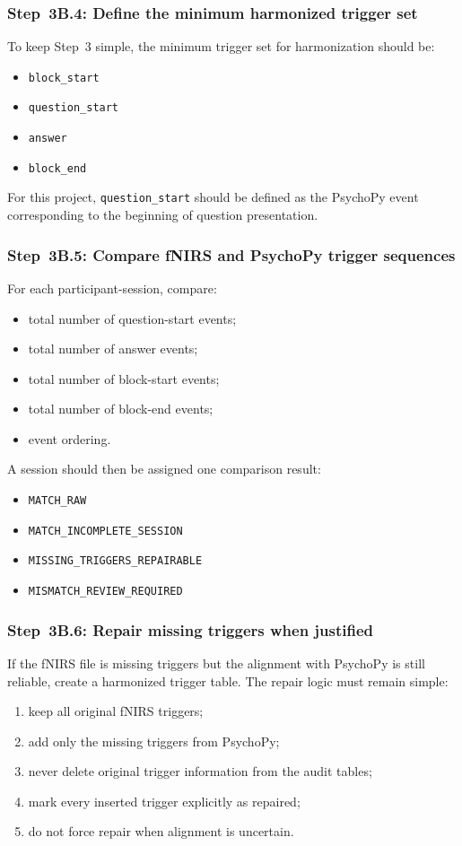 \documentclass[11pt]{article}
\begin{document}
\subsubsection{Step~3B.4: Define the minimum harmonized trigger set}
To keep Step~3 simple, the minimum trigger set for harmonization should be:
\begin{itemize}
    \item \texttt{block\_start}
    \item \texttt{question\_start}
    \item \texttt{answer}
    \item \texttt{block\_end}
\end{itemize}

For this project, \texttt{question\_start} should be defined as the PsychoPy event corresponding to the
beginning of question presentation.

\subsubsection{Step~3B.5: Compare fNIRS and PsychoPy trigger sequences}
For each participant-session, compare:
\begin{itemize}
    \item total number of question-start events;
    \item total number of answer events;
    \item total number of block-start events;
    \item total number of block-end events;
    \item event ordering.
\end{itemize}

A session should then be assigned one comparison result:
\begin{itemize}
    \item \texttt{MATCH\_RAW}
    \item \texttt{MATCH\_INCOMPLETE\_SESSION}
    \item \texttt{MISSING\_TRIGGERS\_REPAIRABLE}
    \item \texttt{MISMATCH\_REVIEW\_REQUIRED}
\end{itemize}

\subsubsection{Step~3B.6: Repair missing triggers when justified}
If the fNIRS file is missing triggers but the alignment with PsychoPy is still reliable,
create a harmonized trigger table.
The repair logic must remain simple:
\begin{enumerate}
    \item keep all original fNIRS triggers;
    \item add only the missing triggers from PsychoPy;
    \item never delete original trigger information from the audit tables;
    \item mark every inserted trigger explicitly as repaired;
    \item do not force repair when alignment is uncertain.
\end{enumerate}
\end{document}

